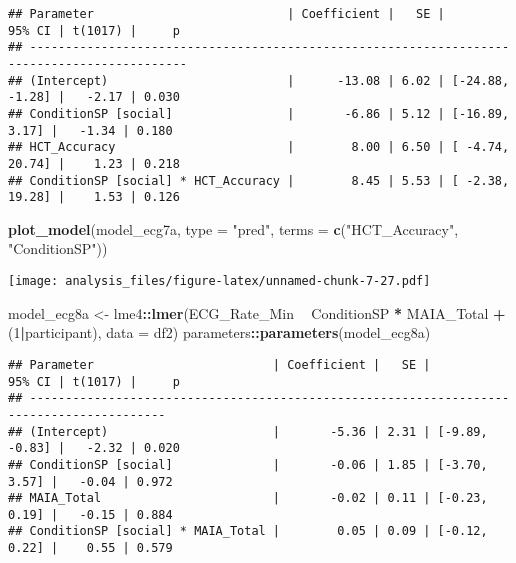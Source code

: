 \documentclass[
]{article}
\newenvironment{Shaded}{\begin{snugshade}}{\end{snugshade}}
\newcommand{\DataTypeTok}[1]{\textcolor[rgb]{0.13,0.29,0.53}{#1}}
\newcommand{\DecValTok}[1]{\textcolor[rgb]{0.00,0.00,0.81}{#1}}
\newcommand{\KeywordTok}[1]{\textcolor[rgb]{0.13,0.29,0.53}{\textbf{#1}}}
\newcommand{\NormalTok}[1]{#1}
\newcommand{\OperatorTok}[1]{\textcolor[rgb]{0.81,0.36,0.00}{\textbf{#1}}}
\newcommand{\StringTok}[1]{\textcolor[rgb]{0.31,0.60,0.02}{#1}}
\begin{document}
\begin{verbatim}
## Parameter                           | Coefficient |   SE |          95% CI | t(1017) |     p
## --------------------------------------------------------------------------------------------
## (Intercept)                         |      -13.08 | 6.02 | [-24.88, -1.28] |   -2.17 | 0.030
## ConditionSP [social]                |       -6.86 | 5.12 | [-16.89,  3.17] |   -1.34 | 0.180
## HCT_Accuracy                        |        8.00 | 6.50 | [ -4.74, 20.74] |    1.23 | 0.218
## ConditionSP [social] * HCT_Accuracy |        8.45 | 5.53 | [ -2.38, 19.28] |    1.53 | 0.126
\end{verbatim}

\begin{Shaded}
\begin{Highlighting}[]
\KeywordTok{plot_model}\NormalTok{(model_ecg7a, }\DataTypeTok{type =} \StringTok{"pred"}\NormalTok{, }\DataTypeTok{terms =} \KeywordTok{c}\NormalTok{(}\StringTok{"HCT_Accuracy"}\NormalTok{, }\StringTok{"ConditionSP"}\NormalTok{))}
\end{Highlighting}
\end{Shaded}

\texttt{[image: analysis\_files/figure-latex/unnamed-chunk-7-27.pdf]}

\begin{Shaded}
\begin{Highlighting}[]
\NormalTok{model_ecg8a <-}\StringTok{ }\NormalTok{lme4}\OperatorTok{::}\KeywordTok{lmer}\NormalTok{(ECG_Rate_Min }\OperatorTok{~}\StringTok{ }\NormalTok{ConditionSP }\OperatorTok{*}\StringTok{ }\NormalTok{MAIA_Total }\OperatorTok{+}\StringTok{ }\NormalTok{(}\DecValTok{1}\OperatorTok{|}\NormalTok{participant), }\DataTypeTok{data =}\NormalTok{ df2)}
\NormalTok{parameters}\OperatorTok{::}\KeywordTok{parameters}\NormalTok{(model_ecg8a)}
\end{Highlighting}
\end{Shaded}

\begin{verbatim}
## Parameter                         | Coefficient |   SE |         95% CI | t(1017) |     p
## -----------------------------------------------------------------------------------------
## (Intercept)                       |       -5.36 | 2.31 | [-9.89, -0.83] |   -2.32 | 0.020
## ConditionSP [social]              |       -0.06 | 1.85 | [-3.70,  3.57] |   -0.04 | 0.972
## MAIA_Total                        |       -0.02 | 0.11 | [-0.23,  0.19] |   -0.15 | 0.884
## ConditionSP [social] * MAIA_Total |        0.05 | 0.09 | [-0.12,  0.22] |    0.55 | 0.579
\end{verbatim}
\end{document}
